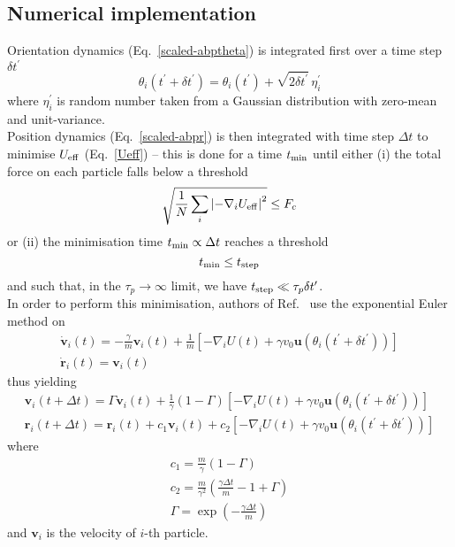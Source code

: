 \documentclass[pre,aps,superscriptaddress,longbibliography,notitlepage]{revtex4-1}
\begin{document}
\subsection{Numerical implementation}

Orientation dynamics (Eq.~\ref{scaled-abptheta}) is integrated first over a time step $\delta t^{\prime}$
\begin{equation}
\theta_i(t^{\prime} + \delta t^{\prime}) = \theta_i(t^{\prime}) + \sqrt{2 \delta t^{\prime}} \, \eta^{\prime}_i
\end{equation}
where $\eta^{\prime}_i$ is random number taken from a Gaussian distribution with zero-mean and unit-variance.\\

Position dynamics (Eq.~\ref{scaled-abpr}) is then integrated with time step $\Delta t$ to minimise $U_{\rm eff}$ (Eq.~\ref{Ueff}) -- this is done for a time $t_{\rm min}$ until either (i) the total force on each particle falls below a threshold
\begin{equation}
\sqrt{\frac{1}{N}\sum_i \left|-\nabla_i U_{\rm eff}\right|^2} \leq F_c
\label{force-threshold}
\end{equation}
or (ii) the minimisation time $t_{\rm min} \propto \Delta t$ reaches a threshold
\begin{equation}
t_{\rm min} \leq t_{\rm step}
\label{time-threshold}
\end{equation}
and such that, in the $\tau_p \to \infty$ limit, we have $t_{\rm step} \ll \tau_p \delta t^{\prime}$.\\

In order to perform this minimisation, authors of Ref.~\cite{mandal2020study} use the exponential Euler method \cite{hochbruck2010exponential} on
\begin{eqnarray}
\dot{\boldsymbol{v}}_i(t) = -\frac{\gamma}{m} \boldsymbol{v}_i(t) + \frac{1}{m}\left[-\nabla_i U(t) + \gamma v_0 \boldsymbol{u}(\theta_i(t^{\prime} + \delta t^{\prime}))\right]\\
\dot{\boldsymbol{r}}_i(t) = \boldsymbol{v}_i(t)
\end{eqnarray}
thus yielding
\begin{eqnarray}
\boldsymbol{v}_i(t + \Delta t) = \Gamma \boldsymbol{v}_i(t) + \frac{1}{\gamma}(1 - \Gamma)\left[-\nabla_i U(t) + \gamma v_0 \boldsymbol{u}(\theta_i(t^{\prime} + \delta t^{\prime}))\right]\\
\boldsymbol{r}_i(t + \Delta t) = \boldsymbol{r}_i(t) + c_1 \boldsymbol{v}_i(t) + c_2 \left[-\nabla_i U(t) + \gamma v_0 \boldsymbol{u}(\theta_i(t^{\prime} + \delta t^{\prime}))\right]
\end{eqnarray}
where
\begin{eqnarray}
c_1 = \frac{m}{\gamma} \left(1 - \Gamma\right)\\
c_2 = \frac{m}{\gamma^2}\left(\frac{\gamma \Delta t}{m} - 1 + \Gamma\right)\\
\Gamma = \exp\left(-\frac{\gamma\Delta t}{m}\right)
\end{eqnarray}
and $\boldsymbol{v}_i$ is the velocity of $i$-th particle.
\end{document}

